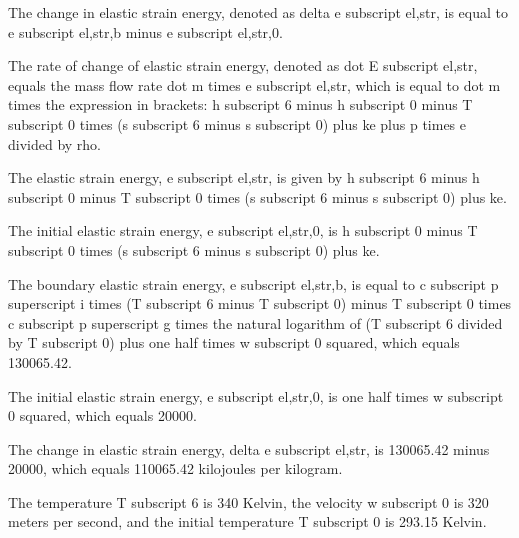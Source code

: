 The change in elastic strain energy, denoted as delta e subscript el,str, is equal to e subscript el,str,b minus e subscript el,str,0.

The rate of change of elastic strain energy, denoted as dot E subscript el,str, equals the mass flow rate dot m times e subscript el,str, which is equal to dot m times the expression in brackets: h subscript 6 minus h subscript 0 minus T subscript 0 times (s subscript 6 minus s subscript 0) plus ke plus p times e divided by rho.

The elastic strain energy, e subscript el,str, is given by h subscript 6 minus h subscript 0 minus T subscript 0 times (s subscript 6 minus s subscript 0) plus ke.

The initial elastic strain energy, e subscript el,str,0, is h subscript 0 minus T subscript 0 times (s subscript 6 minus s subscript 0) plus ke.

The boundary elastic strain energy, e subscript el,str,b, is equal to c subscript p superscript i times (T subscript 6 minus T subscript 0) minus T subscript 0 times c subscript p superscript g times the natural logarithm of (T subscript 6 divided by T subscript 0) plus one half times w subscript 0 squared, which equals 130065.42.

The initial elastic strain energy, e subscript el,str,0, is one half times w subscript 0 squared, which equals 20000.

The change in elastic strain energy, delta e subscript el,str, is 130065.42 minus 20000, which equals 110065.42 kilojoules per kilogram.

The temperature T subscript 6 is 340 Kelvin, the velocity w subscript 0 is 320 meters per second, and the initial temperature T subscript 0 is 293.15 Kelvin.